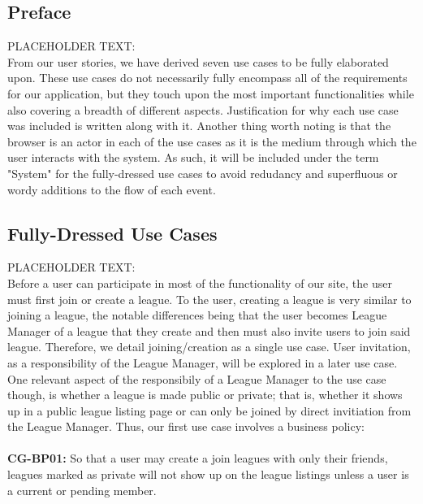 \label{useCases}

\subsection{Preface}
PLACEHOLDER TEXT:\\

From our user stories, we have derived seven use cases to be fully elaborated upon.
These use cases do not necessarily fully encompass all of the requirements for
our application, but they touch upon the most important functionalities while also
covering a breadth of different aspects. Justification for why each use case was
included is written along with it. Another thing worth noting is that the browser is
an actor in each of the use cases as it is the medium through which the user interacts
with the system. As such, it will be included under the term "System" for the
fully-dressed use cases to avoid redudancy and superfluous or wordy additions to the
flow of each event. \\

\subsection{Fully-Dressed Use Cases}
PLACEHOLDER TEXT:\\

Before a user can participate in most of the functionality of our site, the user must
first join or create a league. To the user, creating a league is very similar to
joining a league, the notable differences being that the user becomes League Manager
of a league that they create and then must also invite users to join said league.
Therefore, we detail joining/creation as a single use case. User invitation, as a
responsibility of the League Manager, will be explored in a later use case. One relevant
aspect of the responsibily of a League Manager to the use case though, is whether a league
is made public or private; that is, whether it shows up in a public league listing page or
can only be joined by direct invitiation from the League Manager. Thus, our first use
case involves a business policy: \\ \\

\textbf{CG-BP01:} So that a user may create a join leagues with only their friends,
leagues marked as private will not show up on the league listings unless a user is
a current or pending member. \\


